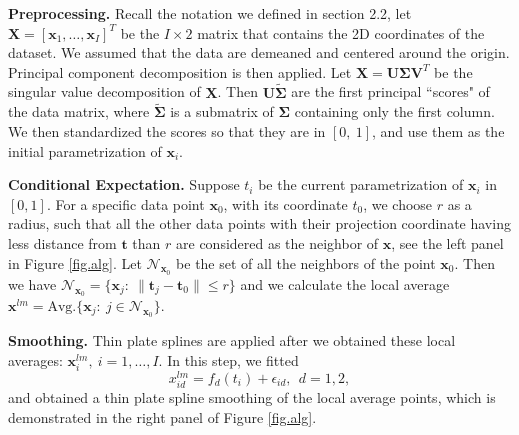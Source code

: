 \documentclass[12pt]{article}
\def\bt{\mathbf{t}}
\def\bx{\mathbf{x}}
\begin{document}
{\bf Preprocessing.} Recall the notation we defined in section 2.2, let $\mathbf{X}=[\mathbf{x}_1, \dots, \mathbf{x}_I]^T$ be the $I\times 2$ matrix that contains the 2D coordinates of the dataset. We assumed that the data are demeaned and centered around the origin. Principal component decomposition is then applied. Let $\mathbf{X}=\mathbf{U}\mathbf{\Sigma}\mathbf{V}^T$ be the singular value decomposition of $\mathbf{X}$. Then $\mathbf{U}\tilde{\mathbf{\Sigma}}$ are the first principal ``scores" of the data matrix, where $\tilde{\mathbf{\Sigma}}$ is a submatrix of $\mathbf{\Sigma}$ containing only the first column. We then standardized the scores so that they are in $[0,\ 1]$, and use them as the initial parametrization of $\mathbf{x}_i$.\

{\bf Conditional Expectation.} Suppose $t_i$ be the current parametrization of $\mathbf{x}_i$ in $[0,1]$. For a specific data point $\bx_0$, with its coordinate $t_0$, we choose $r$ as a radius, such that all the other data points with their projection coordinate having less distance from $\bt$ than $r$ are considered as the neighbor of $\bx$, see the left panel in Figure \ref{fig.alg}. Let $\mathcal{N}_{\bx_0}$ be the set of all the neighbors of the point $\bx_0$. Then we have $\mathcal{N}_{\bx_0}=\big\{\bx_j :\ \|\bt_{j}-\bt_0\|\le r \big\}$ and we calculate the local average $\bx^{lm}=\text{Avg.}\{\bx_j:\ j \in\mathcal{N}_{\bx_0}\}$.

{\bf Smoothing.} Thin plate splines \cite{wood2003thin} are applied after we obtained these local averages: $\bx_i^{lm},\ i=1,\dots,I$. In this step, we fitted
\begin{equation}
x^{lm}_{id}=f_{d}(t_{i})+\epsilon_{id},\ \ d=1,2,
\end{equation}
and obtained a thin plate spline smoothing of the local average points, which is demonstrated in the right panel of Figure \ref{fig.alg}.
\end{document}
